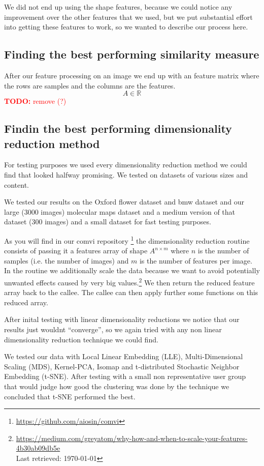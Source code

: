 \documentclass[journal]{vgtc}       %
\newcommand{\todo}[1]{\textcolor{red}{\textbf{TODO:} #1}}
\begin{document}
We did not end up using the shape features, because we could notice any improvement over the other features that we used, but we put substantial effort into getting these features to work, so we wanted to describe our process here.

\subsection{Finding the best performing similarity measure}

After our feature processing on an image we end up with an feature matrix where the rows are samples  and the columns are the features.  \[A \in \mathbb{R}\] \todo{remove (?) }


\subsection{Findin the best performing  dimensionality reduction method}
For testing purposes we used every dimensionality reduction method we could find that looked halfway promising. We tested on datasets of various sizes and content.

We tested our results on the Oxford flower dataset and bmw dataset and our large (3000 images) molecular maps dataset and a medium version of that dataset (300 images) and a small dataset for fast testing purposes.

As you will find in our comvi repository \footnote{\url{https://github.com/aiosin/comvi}} the dimensionality reduction routine consists of passing it a features array of shape \(A^{n\times m}\) where \(n\) is the number of samples (i.e. the number of images) and \(m\) is the number of features per image.
In the routine we additionally scale the data because we want to avoid potentially unwanted effects caused by very big values.\footnote{\url{https://medium.com/greyatom/why-how-and-when-to-scale-your-features-4b30ab09db5e} \\ Last retrieved: \today}
We then return the reduced feature array back to the callee. The callee can then apply further some functions on this reduced array.

After inital testing with linear dimensionality reductions we notice that our results just wouldnt ``converge'', so we again tried with any non linear dimensionality reduction technique we could find.

We tested our data with Local Linear Embedding (LLE), Multi-Dimensional Scaling (MDS), Kernel-PCA, Isomap and t-distributed Stochastic Neighbor Embedding (t-SNE).
After testing with a small non representative user group that would judge how good the clustering was done by the technique we concluded that t-SNE performed the best.
\end{document}
